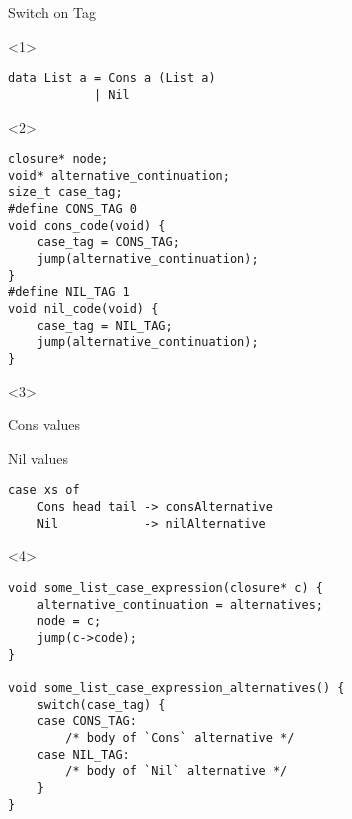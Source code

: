 \documentclass{beamer}
\begin{document}
\begin{frame}[fragile]{Switch on Tag}
  \begin{onlyenv}<1>
    \begin{verbatim}
data List a = Cons a (List a)
            | Nil
    \end{verbatim}
  \end{onlyenv}

  \begin{onlyenv}<2>
    \begin{verbatim}
closure* node;
void* alternative_continuation;
size_t case_tag;
#define CONS_TAG 0
void cons_code(void) {
    case_tag = CONS_TAG;
    jump(alternative_continuation);
}
#define NIL_TAG 1
void nil_code(void) {
    case_tag = NIL_TAG;
    jump(alternative_continuation);
}
    \end{verbatim}
  \end{onlyenv}

  \begin{onlyenv}<3>
    \begin{block}{Cons values}
      \texttt{}
    \end{block}
    \begin{block}{Nil values}
      \texttt{}
    \end{block}

    \begin{verbatim}
case xs of
    Cons head tail -> consAlternative
    Nil            -> nilAlternative
    \end{verbatim}
  \end{onlyenv}

  \begin{onlyenv}<4>
    \begin{verbatim}
void some_list_case_expression(closure* c) {
    alternative_continuation = alternatives;
    node = c;
    jump(c->code);
}

void some_list_case_expression_alternatives() {
    switch(case_tag) {
    case CONS_TAG:
        /* body of `Cons` alternative */
    case NIL_TAG:
        /* body of `Nil` alternative */
    }
}
    \end{verbatim}
  \end{onlyenv}
\end{frame}
\end{document}
